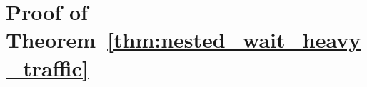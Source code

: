 \section{Proof of Theorem~\ref{thm:nested_wait_heavy_traffic}}\label{appendix::proof of nested_wait_heavy_traffic}

